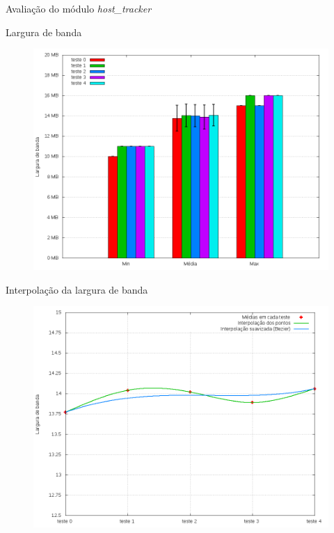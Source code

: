 \begin{frame}{Avaliação do módulo \emph{host\_tracker}}
    
    
\end{frame}


\begin{frame}{Largura de banda}

    \begin{figure}[!htb]
        \centering
        \includegraphics[scale=.35]{images/host_tracker-bandwidth}
    \end{figure}

\end{frame}


\begin{frame}{Interpolação da largura de banda}

    \begin{figure}[!htb]
        \centering
        \includegraphics[scale=.35]{images/host_tracker-bandwidth-growth}
    \end{figure}

\end{frame}


